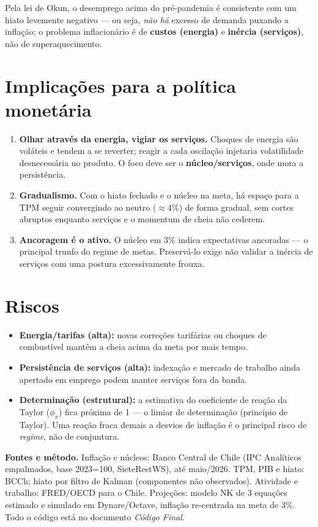 \documentclass[11pt]{article}
\begin{document}
Pela lei de Okun, o desemprego acima do pré-pandemia é consistente com um hiato
levemente negativo --- ou seja, \emph{não há} excesso de demanda puxando a inflação;
o problema inflacionário é de \textbf{custos (energia)} e \textbf{inércia
(serviços)}, não de superaquecimento.

\section{Implicações para a política monetária}
\begin{enumerate}[nosep]
  \item \textbf{Olhar através da energia, vigiar os serviços.} Choques de energia são
  voláteis e tendem a se reverter; reagir a cada oscilação injetaria volatilidade
  desnecessária no produto. O foco deve ser o \textbf{núcleo/serviços}, onde mora a
  persistência.
  \item \textbf{Gradualismo.} Com o hiato fechado e o núcleo na meta, há espaço para
  a TPM seguir convergindo ao neutro ($\approx$4\%) de forma gradual, sem cortes
  abruptos enquanto serviços e o momentum de cheia não cederem.
  \item \textbf{Ancoragem é o ativo.} O núcleo em 3\% indica expectativas ancoradas
  --- o principal trunfo do regime de metas. Preservá-lo exige não validar a inércia
  de serviços com uma postura excessivamente frouxa.
\end{enumerate}

\section{Riscos}
\begin{itemize}[nosep]
  \item \textbf{Energia/tarifas (alta):} novas correções tarifárias ou choques de
  combustível mantêm a cheia acima da meta por mais tempo.
  \item \textbf{Persistência de serviços (alta):} indexação e mercado de trabalho
  ainda apertado em emprego podem manter serviços fora da banda.
  \item \textbf{Determinação (estrutural):} a estimativa do coeficiente de reação da
  Taylor ($\phi_\pi$) fica próxima de 1 --- o limiar de determinação (princípio de
  Taylor). Uma reação fraca demais a desvios de inflação é o principal risco de
  \emph{regime}, não de conjuntura.
\end{itemize}

\vfill
{\footnotesize\noindent\textbf{Fontes e método.} Inflação e núcleos: Banco Central de
Chile (IPC Analíticos empalmados, base 2023=100, SieteRestWS), até maio/2026. TPM, PIB
e hiato: BCCh; hiato por filtro de Kalman (componentes não observados). Atividade e
trabalho: FRED/OECD para o Chile. Projeções: modelo NK de 3 equações estimado e
simulado em Dynare/Octave, inflação re-centrada na meta de 3\%. Todo o código está no
documento \emph{Código Final}.\par}
\end{document}

